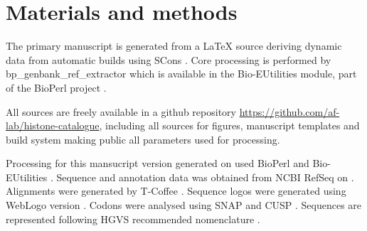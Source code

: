 \section{Materials and methods}
\label{sec:matmethods}

  The primary manuscript is generated from a \LaTeX{} source
  deriving dynamic data from automatic builds using SCons \citep{SCons2005}.
  Core processing is performed by bp\_genbank\_ref\_extractor
  which is available in the Bio-EUtilities module, part of the
  BioPerl project \citep{bioperl}.

  All sources are freely available in a github repository
  \url{https://github.com/af-lab/histone-catalogue}, including all
  sources for figures, manuscript templates and build system making public
  all parameters used for processing.

  Processing for this mansucript version generated on 
  used BioPerl \BioPerlVersion{} and Bio-EUtilities \BioEUtilitiesVersion{}.
  Sequence and annotation data was obtained from NCBI RefSeq \citep{PruittRefseq2014}
  on \printdate{\SequencesDate{}}.
  Alignments were generated by T-Coffee \TCoffeVersion{} \citep{tcoffee2000}.
  Sequence logos were generated using WebLogo version  \citep{weblogo}.
  Codons were analysed using SNAP  \citep{KorberSNAP2000}
  and CUSP  \citep{Emboss2000}.
  Sequences are represented following HGVS recommended nomenclature \citep{mutnomenclature2003}.
